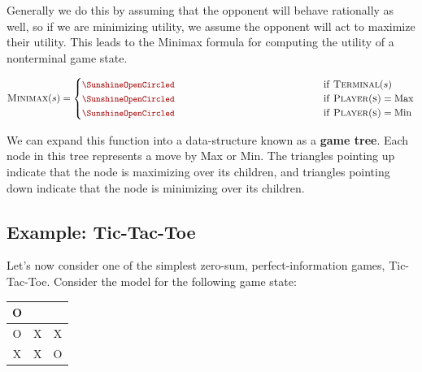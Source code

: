 \documentclass[11pt]{article}
\begin{document}
Generally we do this by assuming that the opponent will behave rationally as well, so if we are minimizing utility, we assume the opponent will act to maximize their utility. This leads to the Minimax formula for computing the utility of a nonterminal game state.

\[ \msc{Minimax}(s) = \begin{cases} 
  \censorm{\msc{Utility}(s)} & \mathrm{if\ } \msc{Terminal}(s)  \\
  \censorm{\max_{a \in \msc{Act}(s)}  \msc{Minimax}(\msc{Res}(s, a))} & \mathrm{if\ } \msc{Player(s)} = \mathrm{Max}  \\
  \censorm{\min_{a \in \msc{Act}(s) } \msc{Minimax}(\msc{Res}(s, a))} & \mathrm{if\ } \msc{Player(s)} = \mathrm{Min} \end{cases}\] 

We can expand this function into a data-structure known as a \textbf{game tree}. Each node in this tree represents a move by Max or Min. The triangles pointing up indicate that the node is maximizing over its children, and triangles pointing down indicate that the node is minimizing over its children.

\begin{center}
\end{center}



\subsection{Example: Tic-Tac-Toe}

Let's now consider one of the simplest zero-sum, perfect-information games, Tic-Tac-Toe. Consider the model for the following game state:


\begin{center}  
\begin{tabular}{c|c|c}
  O  &   &  \\
  \hline
  O  & X & X \\
  \hline
  X  & X & O
\end{tabular}
\end{center}
\end{document}
